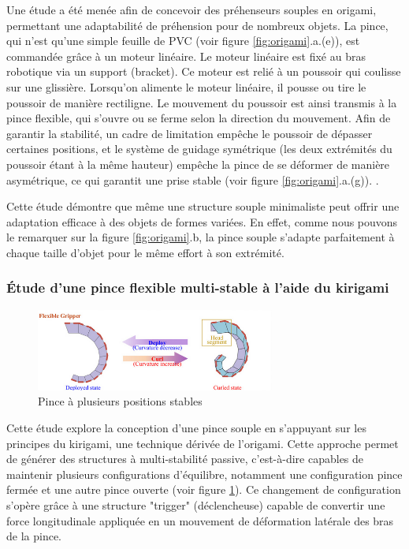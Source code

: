 \documentclass[a4paper, 11pt]{report}
\begin{document}
            Une étude a été menée afin de concevoir des préhenseurs souples en origami, permettant une adaptabilité de préhension pour de nombreux objets. La pince, qui n'est qu'une simple feuille de PVC (voir figure \ref{fig:origami}.a.(e)), est commandée grâce à un moteur linéaire. Le moteur linéaire est fixé au bras robotique via un support (bracket). Ce moteur est relié à un poussoir qui coulisse sur une glissière. Lorsqu’on alimente le moteur linéaire, il pousse ou tire le poussoir de manière rectiligne. Le mouvement du poussoir est ainsi transmis à la pince flexible, qui s’ouvre ou se ferme selon la direction du mouvement. Afin de garantir la stabilité, un cadre de limitation empêche le poussoir de dépasser certaines positions, et le système de guidage symétrique (les deux extrémités du poussoir étant à la même hauteur) empêche la pince de se déformer de manière asymétrique, ce qui garantit une prise stable (voir figure \ref{fig:origami}.a.(g)). \cite{liu_origami_2023}.
    
            Cette étude démontre que même une structure souple minimaliste peut offrir une adaptation efficace à des objets de formes variées. En effet, comme nous pouvons le remarquer sur la figure \ref{fig:origami}.b, la pince souple s'adapte parfaitement à chaque taille d'objet pour le même effort à son extrémité.

        \subsubsection{Étude d'une pince flexible multi-stable à l'aide du kirigami}
    
            \begin{figure}
                \centering
                \includegraphics[width=0.7\textwidth]{Figures/multi-stable.png}
                \caption{Pince à plusieurs positions stables \cite{qi_kirigami_2024}}
                \label{fig:multi_stable}
            \end{figure}
    
            Cette étude \cite{qi_kirigami_2024} explore la conception d'une pince souple en s'appuyant sur les principes du kirigami, une technique dérivée de l'origami. Cette approche permet de générer des structures à multi-stabilité passive, c’est-à-dire capables de maintenir plusieurs configurations d’équilibre, notamment une configuration pince fermée et une autre pince ouverte (voir figure \ref{fig:multi_stable}). Ce changement de configuration s'opère grâce à une structure "trigger" (déclencheuse) capable de convertir une force longitudinale appliquée en un mouvement de déformation latérale des bras de la pince.
    
\end{document}
